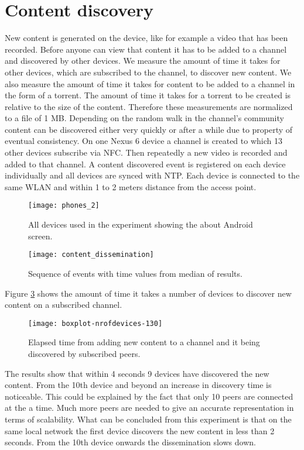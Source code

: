 \section{Content discovery}
New content is generated on the device, like for example a video that has been recorded.
Before anyone can view that content it has to be added to a channel and discovered by other devices.
We measure the amount of time it takes for other devices, which are subscribed to the channel, to discover new content.
We also measure the amount of time it takes for content to be added to a channel in the form of a torrent.
The amount of time it takes for a torrent to be created is relative to the size of the content.
Therefore these measurements are normalized to a file of 1 MB.
Depending on the random walk in the channel's community content can be discovered either very quickly or after a while due to property of eventual consistency.
On one Nexus 6 device a channel is created to which 13 other devices subscribe via NFC.
Then repeatedly a new video is recorded and added to that channel.
A content discovered event is registered on each device individually and all devices are synced with NTP.
Each device is connected to the same WLAN and within 1 to 2 meters distance from the access point.
\begin{figure}[H]
	\centering
	\texttt{[image: phones\_2]}
	\caption{All devices used in the experiment showing the about Android screen.}
	\label{fig:phones_2}
\end{figure}
\begin{figure}[H]
	\centering
	\texttt{[image: content\_dissemination]}
	\caption{Sequence of events with time values from median of results.}
	\label{fig:content_dissemination}
\end{figure}
Figure \ref{fig:boxplot-nr.of.devices-130} shows the amount of time it takes a number of devices to discover new content on a subscribed channel.
\begin{figure}[H]
	\centering %
	\texttt{[image: boxplot-nrofdevices-130]}
	\caption{Elapsed time from adding new content to a channel and it being discovered by subscribed peers.}
	\label{fig:boxplot-nr.of.devices-130}
\end{figure}
The results show that within 4 seconds 9 devices have discovered the new content.
From the 10th device and beyond an increase in discovery time is noticeable.
This could be explained by the fact that only 10 peers are connected at the a time.
Much more peers are needed to give an accurate representation in terms of scalability.
What can be concluded from this experiment is that on the same local network the first device discovers the new content in less than 2 seconds.
From the 10th device onwards the dissemination slows down.


